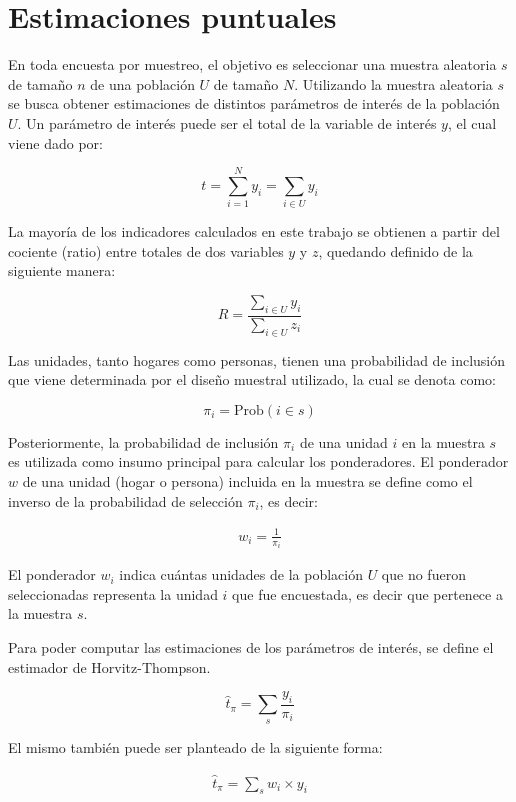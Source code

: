 \documentclass[12pt,twoside,spanish,a4paper]{book}\usepackage[]{graphicx}\usepackage[]{color}
\begin{document}
\section{Estimaciones puntuales \label{sec:estpunt}}

En toda encuesta por muestreo, el objetivo es seleccionar una muestra aleatoria $s$ de tamaño $n$ de una población $U$ de tamaño $N$. Utilizando la muestra aleatoria $s$ se busca obtener estimaciones de distintos parámetros de interés de la población $U$. Un parámetro de interés puede ser el total de la variable de interés $y$, el cual viene dado por:

\[ t=\sum_{i=1}^{N}y_{i}=\sum_{i\in U}^{}y_{i} \]

La mayoría de los indicadores calculados en este trabajo se obtienen a partir del cociente (ratio) entre totales de dos variables $y$ y $z$, quedando definido de la siguiente manera:

\[ R=\frac{\sum_{i\in U} y_i}{\sum_{i\in U} z_i} \]

Las unidades, tanto hogares como personas, tienen una probabilidad de inclusión que viene determinada por el diseño muestral utilizado, la cual se denota como:

\[ \pi_i=\text{Prob} (i \in s) \]

Posteriormente, la probabilidad de inclusión $\pi_i$ de una unidad $i$ en la muestra $s$ es utilizada como insumo principal para calcular los ponderadores. El ponderador $w$ de una unidad (hogar o persona) incluida en la muestra se define como el inverso de la probabilidad de selección $\pi_i$, es decir:

\begin{equation}\label{m4}
\begin{array}{cc}
w_i=\frac{1}{\pi_i}
\end{array}
\end{equation}

El ponderador $w_i$ indica cuántas unidades de la población $U$ que no fueron seleccionadas representa la unidad $i$ que fue encuestada, es decir que pertenece a la muestra $s$.

Para poder computar las estimaciones de los parámetros de interés, se define el estimador de Horvitz-Thompson.

\[ \hat{t}_{\pi }=\sum_{s}^{}\frac{y_{i}}{\pi _{i}} \]

El mismo también puede ser planteado de la siguiente forma:

\begin{equation}\label{m6}
\begin{array}{cc}
\hat{t}_{\pi }=\sum_{s}^{}w_i \times y_i
\end{array}
\end{equation}
\end{document}
